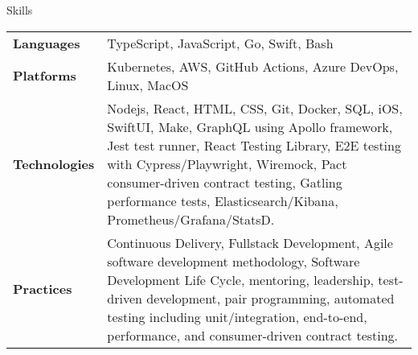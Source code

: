 \begin{section}{Skills}
  \begin{tabularx}{\linewidth}{@{}l X@{}}
    \textbf{Languages} &\small{TypeScript, JavaScript, Go, Swift, Bash} \\
    \textbf{Platforms} &\small{Kubernetes, AWS, GitHub Actions, Azure DevOps, Linux, MacOS} \\
    \textbf{Technologies} &\small{Nodejs, React, HTML, CSS, Git, Docker, SQL, iOS, SwiftUI, Make, GraphQL using Apollo framework, Jest test runner, React Testing Library, E2E testing with Cypress/Playwright, Wiremock, Pact consumer-driven contract testing, Gatling performance tests, Elasticsearch/Kibana, Prometheus/Grafana/StatsD.} \\
    \textbf{Practices} &\small{Continuous Delivery, Fullstack Development, Agile software development methodology, Software Development Life Cycle, mentoring, leadership, test-driven development, pair programming, automated testing including unit/integration, end-to-end, performance, and consumer-driven contract testing.} \\
  \end{tabularx}
\end{section}
